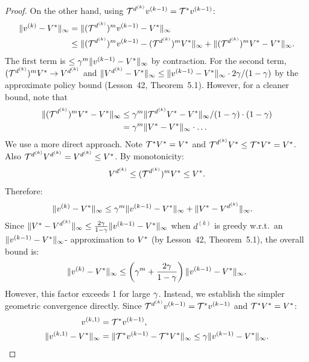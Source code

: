 \documentclass[11pt,a4paper]{article}
\begin{document}
\begin{proof}
On the other hand, using $\mathcal{T}^{d^{(k)}} v^{(k-1)} = \mathcal{T}^*
v^{(k-1)}$:
\begin{align*}
    \|v^{(k)} - V^*\|_\infty
    &= \|(\mathcal{T}^{d^{(k)}})^m v^{(k-1)} - V^*\|_\infty \\
    &\leq \|(\mathcal{T}^{d^{(k)}})^m v^{(k-1)}
    - (\mathcal{T}^{d^{(k)}})^m V^*\|_\infty
    + \|(\mathcal{T}^{d^{(k)}})^m V^* - V^*\|_\infty.
\end{align*}
The first term is $\leq \gamma^m
\|v^{(k-1)} - V^*\|_\infty$ by contraction. For the second term,
$(\mathcal{T}^{d^{(k)}})^m V^* \to V^{d^{(k)}}$ and
$\|V^{d^{(k)}} - V^*\|_\infty \leq
\|v^{(k-1)} - V^*\|_\infty \cdot 2\gamma/(1-\gamma)$
by the approximate policy bound (Lesson~42, Theorem~5.1). However,
for a cleaner bound, note that
\begin{align*}
    \|(\mathcal{T}^{d^{(k)}})^m V^* - V^*\|_\infty
    &\leq \gamma^m \|\mathcal{T}^{d^{(k)}} V^* -
    V^*\|_\infty / (1-\gamma) \cdot (1-\gamma) \\
    &= \gamma^m \|V^* - V^*\|_\infty \cdot \ldots
\end{align*}
We use a more direct approach. Note
$\mathcal{T}^* V^* = V^*$ and
$\mathcal{T}^{d^{(k)}} V^* \leq \mathcal{T}^* V^* = V^*$.
Also $\mathcal{T}^{d^{(k)}} V^{d^{(k)}} = V^{d^{(k)}} \leq V^*$.
By monotonicity:
\[
    V^{d^{(k)}} \leq (\mathcal{T}^{d^{(k)}})^m V^* \leq V^*.
\]
Therefore:
\begin{align*}
    \|v^{(k)} - V^*\|_\infty
    &\leq \gamma^m \|v^{(k-1)} - V^*\|_\infty
    + \|V^* - V^{d^{(k)}}\|_\infty.
\end{align*}
Since $\|V^* - V^{d^{(k)}}\|_\infty \leq
\frac{2\gamma}{1-\gamma} \|v^{(k-1)} - V^*\|_\infty$
when $d^{(k)}$ is greedy w.r.t.\ an $\|v^{(k-1)} - V^*\|_\infty$-
approximation to $V^*$ (by Lesson~42, Theorem~5.1), the overall
bound is:
\[
    \|v^{(k)} - V^*\|_\infty \leq
    \left(\gamma^m + \frac{2\gamma}{1-\gamma}\right)
    \|v^{(k-1)} - V^*\|_\infty.
\]
However, this factor exceeds 1 for large $\gamma$. Instead, we
establish the simpler geometric convergence directly. Since
$\mathcal{T}^{d^{(k)}} v^{(k-1)} = \mathcal{T}^* v^{(k-1)}$ and
$\mathcal{T}^* V^* = V^*$:
\begin{align*}
    v^{(k,1)} &= \Bellman^* v^{(k-1)}, \\
    \|v^{(k,1)} - \Vstar\|_\infty
    &= \|\Bellman^* v^{(k-1)} - \Bellman^* \Vstar\|_\infty
    \leq \discount \|v^{(k-1)} - \Vstar\|_\infty.

\end{align*}
\end{proof}
\end{document}
